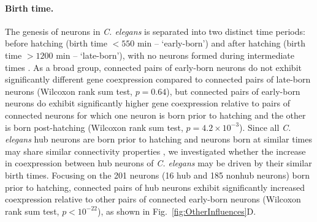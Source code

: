 \documentclass[10pt,letterpaper]{article}
\begin{document}
{\paragraph{Birth time.}
The genesis of neurons in \emph{C. elegans} is separated into two distinct time periods: before hatching (birth time $<550$ min -- `early-born') and after hatching (birth time $>1200$ min -- `late-born'), with no neurons formed during intermediate times \cite{Varier2011}.
As a broad group, connected pairs of early-born neurons do not exhibit significantly different gene coexpression compared to connected pairs of late-born neurons (Wilcoxon rank sum test, $p = 0.64$), but connected pairs of early-born neurons do exhibit significantly higher gene coexpression relative to pairs of connected neurons for which one neuron is born prior to hatching and the other is born post-hatching (Wilcoxon rank sum test, $p = 4.2 \times 10^{-3}$).
Since all \emph{C. elegans} hub neurons are born prior to hatching \cite{Towlson2013} and neurons born at similar times may share similar connectivity properties \cite{Schroter:2017eo}, we investigated whether the increase in coexpression between hub neurons of \emph{C. elegans} may be driven by their similar birth times.
Focusing on the 201 neurons (16 hub and 185 nonhub neurons) born prior to hatching, connected pairs of hub neurons exhibit significantly increased coexpression relative to other pairs of connected early-born neurons (Wilcoxon rank sum test, $p < 10^{-22}$), as shown in Fig.~\ref{fig:OtherInfluences}D.


}
\end{document}
